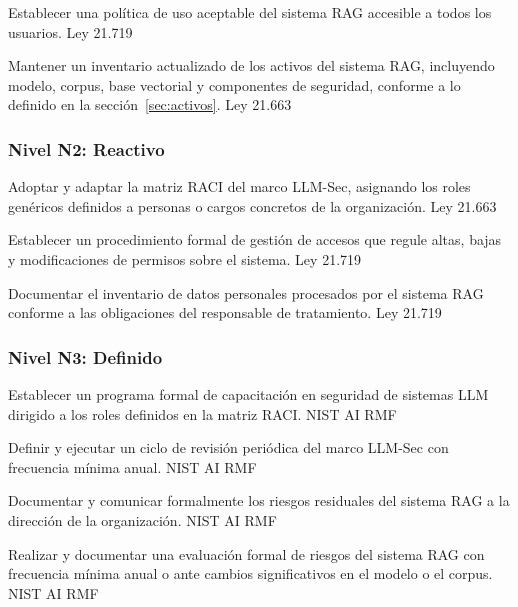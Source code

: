   {Establecer una política de uso aceptable del sistema RAG accesible a todos los usuarios.}
  {Ley 21.719}

  {Mantener un inventario actualizado de los activos del sistema RAG, incluyendo modelo, corpus, base vectorial y componentes de seguridad, conforme a lo definido en la sección~\ref{sec:activos}.}
  {Ley 21.663}

\subsubsection*{Nivel N2: Reactivo}

  {Adoptar y adaptar la matriz RACI del marco LLM-Sec, asignando los roles genéricos definidos a personas o cargos concretos de la organización.}
  {Ley 21.663}

  {Establecer un procedimiento formal de gestión de accesos que regule altas, bajas y modificaciones de permisos sobre el sistema.}
  {Ley 21.719}

  {Documentar el inventario de datos personales procesados por el sistema RAG conforme a las obligaciones del responsable de tratamiento.}
  {Ley 21.719}

\subsubsection*{Nivel N3: Definido}

  {Establecer un programa formal de capacitación en seguridad de sistemas LLM dirigido a los roles definidos en la matriz RACI.}
  {NIST AI RMF}

  {Definir y ejecutar un ciclo de revisión periódica del marco LLM-Sec con frecuencia mínima anual.}
  {NIST AI RMF}

  {Documentar y comunicar formalmente los riesgos residuales del sistema RAG a la dirección de la organización.}
  {NIST AI RMF}

  {Realizar y documentar una evaluación formal de riesgos del sistema RAG con frecuencia mínima anual o ante cambios significativos en el modelo o el corpus.}
  {NIST AI RMF}

